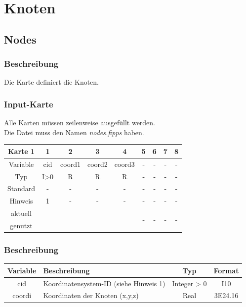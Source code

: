 \documentclass[11pt,titlepage,listof=totoc,bibliography=totoc,twoside]{scrreprt}
\begin{document}
{{\newpage

\section{Knoten}

\subsection{Nodes}

\subsubsection{Beschreibung}

Die Karte definiert die Knoten.

\subsubsection{Input-Karte}

Alle Karten müssen zeilenweise ausgefüllt werden.\\
Die Datei muss den Namen \emph{nodes.fipps} haben.

\begin{table}[htbp]
\centering
\begin{tabularx}{\textwidth}{cCCCCCCCC}
\toprule
Karte 1	& 1		& 2		& 3		& 4		& 5		& 6		& 7	& 8	\\
\midrule
Variable& cid		& coord1	& coord2	& coord3	& - 		& -	  	& -	& -	\\
Typ	& I>0		& R		& R		& R  		& -		& -	  	& -	& -	\\
Standard& -		& -		& -		& -		& -		& -		& -	& -	\\
Hinweis	& 1		& -		& -		& -		& -		& -		& -	& -	\\
aktuell	& 	& 	& 	& 	& 	& \multirow{2}{*}{-}	& 	& 	\\
genutzt \\
\bottomrule
\end{tabularx}
\end{table}

\subsubsection{Beschreibung}

\begin{tabularx}{\textwidth}{cXcc}
\toprule
Variable	& Beschreibung																						& Typ		& Format\\
\midrule
cid		& Koordinatensystem-ID	(siehe Hinweis 1)	& Integer > 0	& I10	\\
coordi 		& Koordinaten der Knoten (x,y,z)		& Real		& 3E24.16\\
\bottomrule
\end{tabularx}

}}
\end{document}
